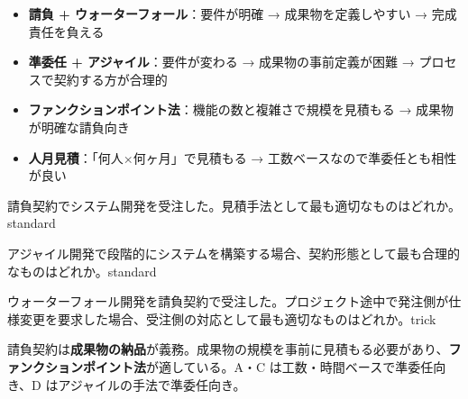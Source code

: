 \begin{keypoint}
\begin{itemize}
  \item \textbf{請負 + ウォーターフォール}：要件が明確 → 成果物を定義しやすい → 完成責任を負える
  \item \textbf{準委任 + アジャイル}：要件が変わる → 成果物の事前定義が困難 → プロセスで契約する方が合理的
  \item \textbf{ファンクションポイント法}：機能の数と複雑さで規模を見積もる → 成果物が明確な請負向き
  \item \textbf{人月見積}：「何人×何ヶ月」で見積もる → 工数ベースなので準委任とも相性が良い
\end{itemize}
\end{keypoint}


\begin{mondai}{請負契約でシステム開発を受注した。見積手法として最も適切なものはどれか。}{standard}
\end{mondai}

\begin{mondai}{アジャイル開発で段階的にシステムを構築する場合、契約形態として最も合理的なものはどれか。}{standard}
\end{mondai}

\begin{mondai}{ウォーターフォール開発を請負契約で受注した。プロジェクト途中で発注側が仕様変更を要求した場合、受注側の対応として最も適切なものはどれか。}{trick}
\end{mondai}

\kaitoupage


\begin{kaisetsu}
請負契約は\textbf{成果物の納品}が義務。成果物の規模を事前に見積もる必要があり、\textbf{ファンクションポイント法}が適している。A・C は工数・時間ベースで準委任向き、D はアジャイルの手法で準委任向き。
\end{kaisetsu}

